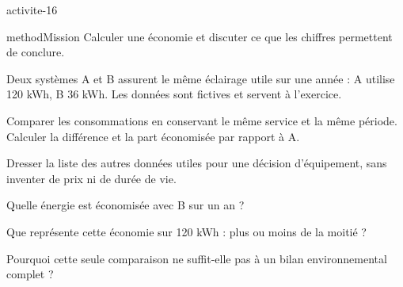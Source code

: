 \documentclass[12pt,twoside,openany]{book}
\begin{document}
\label{ch-16-activite}
\begin{pcFiche}{activite-16}
\begin{pcEncadre}{method}{Mission}
Calculer une économie et discuter ce que les chiffres permettent de conclure.\par
\end{pcEncadre}
\begin{questions}
\item Deux systèmes A et B assurent le même éclairage utile sur une année : A utilise 120 kWh, B 36 kWh. Les données sont fictives et servent à l’exercice.
\item Comparer les consommations en conservant le même service et la même période. Calculer la différence et la part économisée par rapport à A.
\item Dresser la liste des autres données utiles pour une décision d’équipement, sans inventer de prix ni de durée de vie.
\end{questions}
\begin{questions}
\item Quelle énergie est économisée avec B sur un an ?
\item Que représente cette économie sur 120 kWh : plus ou moins de la moitié ?
\item Pourquoi cette seule comparaison ne suffit-elle pas à un bilan environnemental complet ?
\end{questions}
\end{pcFiche}
\label{ch-16-bilan}
\end{document}
